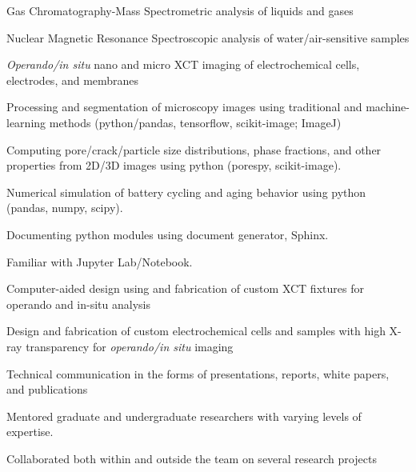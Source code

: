 \documentclass[11pt]{article}
\newcommand{\skill}[1]{\noindent{$\blacksquare~$} #1}
\begin{document}
\skill{Gas Chromatography-Mass Spectrometric analysis of liquids and gases}

\skill{Nuclear Magnetic Resonance Spectroscopic analysis of water/air-sensitive samples} 

\skill{\textit{Operando/in situ} nano and micro XCT imaging of electrochemical cells, electrodes, and membranes} 

\skill{Processing and segmentation of microscopy images using traditional and machine-learning methods (python/pandas, tensorflow, scikit-image; ImageJ)}

\skill{Computing pore/crack/particle size distributions, phase fractions, and other properties from 2D/3D images using python (porespy, scikit-image).}

\skill{Numerical simulation of battery cycling and aging behavior using python (pandas, numpy, scipy).}

\skill{Documenting python modules using document generator, Sphinx.}

\skill{Familiar with Jupyter Lab/Notebook.}

\skill{Computer-aided design using and fabrication of custom XCT fixtures for operando and in-situ analysis}

\skill{Design and fabrication of custom electrochemical cells and samples with high X-ray transparency for \textit{operando/in situ} imaging}

\skill{Technical communication in the forms of presentations, reports, white papers, and publications}

\skill{Mentored graduate and undergraduate researchers with varying levels of expertise.}

\skill{Collaborated both within and outside the team on several research projects}
\end{document}
